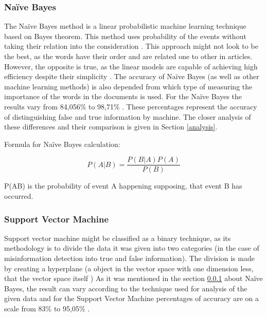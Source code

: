\documentclass[11pt ,english,a4paper]{article}
\begin{document}
\subsubsection{Naïve Bayes}\label{nb}
The Naïve Bayes method is a linear probabilistic machine learning technique based on Bayes theorem. This method uses probability of the events without taking their relation into the consideration \cite{sha20mach}. This approach might not look to be the best, as the words have their order and are related one to other in articles. However, the opposite is true, as the linear models are capable of achieving high efficiency despite their simplicity \cite{pod19mach}. The accuracy of Naïve Bayes (as well as other machine learning methods) is also depended from which type of measuring the importance of the words in the documents is used. For the Naïve Bayes the results vary from 84,056\% \cite{sha20mach} to 98,71\% \cite{bar21health}. These percentages represent the accuracy of distinguishing false and true information by machine. The closer analysis of these differences and their comparison is given in Section \ref{analysis}.

Formula for Naïve Bayes calculation: \cite{sha20mach}

\begin{equation}
P(A|B) = \frac{P(B|A)P(A)}{P(B)}
\end{equation}

P(A\textbar B) is the probability of event A happening supposing, that event B has occurred.

\subsubsection{Support Vector Machine}\label{svm}
Support vector machine might be classified as a binary technique, as its methodology is to divide the data it was given into two categories \cite{pod19mach} (in the case of misinformation detection into true and false information). The division is made by creating a hyperplane (a object in the vector space with one dimension less, that the vector space itself \cite{sha20mach})
As it was mentioned in the section \ref{nb} about Naïve Bayes, the result can vary according to the technique used for analysis of the given data and for the Support Vector Machine percentages of accuracy are on a scale from 83\% \cite{chap22unmask} to 95,05\% \cite{sha20mach}.

\end{document}
